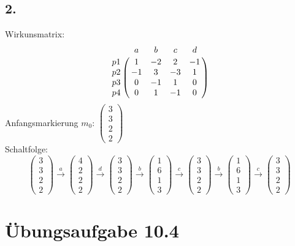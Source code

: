 \documentclass[a4paper,12pt]{scrartcl}
\begin{document}
\subsection{2.}
Wirkunsmatrix:
\[
	\bordermatrix{
	   &  a	&  b &  c &  d \cr
	p1 &  1 & -2 &  2 &  -1 \cr
	p2 & -1 &  3 &  -3 &  1 \cr
	p3 &  0 &  -1 & 1 &  0 \cr
	p4 &  0 &  1 & -1 &  0 \cr}
\]
Anfangsmarkierung \(m_0\): \( \begin{pmatrix} 3 \\ 3 \\ 2 \\ 2 \end{pmatrix} \) \\
Schaltfolge:
\[ 
	\begin{pmatrix} 3 \\ 3 \\ 2 \\ 2 \end{pmatrix} \xrightarrow{a}
	\begin{pmatrix} 4 \\ 2 \\ 2 \\ 2 \end{pmatrix} \xrightarrow{d}
	\begin{pmatrix} 3 \\ 3 \\ 2 \\ 2 \end{pmatrix} \xrightarrow{b}
	\begin{pmatrix} 1 \\ 6 \\ 1 \\ 3 \end{pmatrix} \xrightarrow{c}
	\begin{pmatrix} 3 \\ 3 \\ 2 \\ 2 \end{pmatrix} \xrightarrow{b}
	\begin{pmatrix} 1 \\ 6 \\ 1 \\ 3 \end{pmatrix} \xrightarrow{c}
	\begin{pmatrix} 3 \\ 3 \\ 2 \\ 2 \end{pmatrix}
\]

\section{Übungsaufgabe 10.4}
\end{document}
